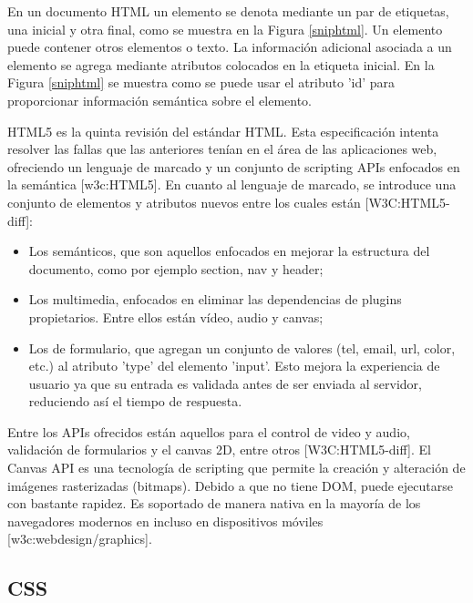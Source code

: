 En un documento HTML un elemento se denota mediante un par de etiquetas, una inicial y otra final, como se muestra en la Figura \ref{sniphtml}. Un elemento puede contener otros elementos o texto. La información adicional asociada a un elemento se agrega mediante atributos colocados en la etiqueta inicial. En la Figura \ref{sniphtml} se muestra como se puede usar el atributo 'id' para proporcionar información semántica sobre el elemento.



HTML5 es la quinta revisión del estándar HTML. Esta especificación intenta resolver las fallas que las anteriores tenían en el área de las aplicaciones web, ofreciendo un lenguaje de marcado y un conjunto de scripting APIs enfocados en la semántica [w3c:HTML5]. En cuanto al lenguaje de marcado, se introduce una conjunto de elementos y atributos nuevos entre los cuales están [W3C:HTML5-diff]:

\begin{itemize}
  \item Los semánticos, que son aquellos enfocados en mejorar la estructura del documento, como por ejemplo section, nav y header;
  \item Los multimedia, enfocados en eliminar las dependencias de plugins propietarios. Entre ellos están vídeo, audio y canvas;
  \item Los de formulario, que agregan un conjunto de valores (tel, email, url, color, etc.) al atributo 'type' del elemento 'input'. Esto mejora la experiencia de usuario ya que su entrada es validada antes  de ser enviada al servidor, reduciendo así el tiempo de respuesta.
\end{itemize}

Entre los APIs ofrecidos están aquellos para el control de video y audio, validación de formularios y el canvas 2D, entre otros [W3C:HTML5-diff]. El Canvas API es una tecnología de scripting que permite la creación y alteración de imágenes rasterizadas (bitmaps). Debido a que no tiene DOM, puede ejecutarse con bastante rapidez. Es soportado de manera nativa en la mayoría de los navegadores modernos en incluso en dispositivos móviles [w3c:webdesign/graphics].

\subsection{CSS}

